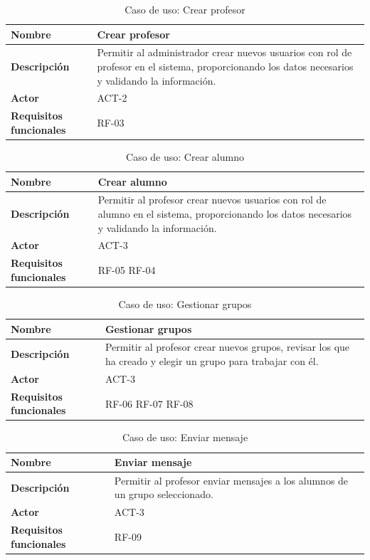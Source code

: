 \begin{table}[H]
\centering
\begin{tabularx}{\textwidth}{
  |>{\centering\arraybackslash}l
  |>{\centering\arraybackslash}X|}
\hline
\textbf{Nombre} & {\textbf{Crear profesor}} \\ \hline

\textbf{Descripción} & Permitir al administrador crear nuevos usuarios con rol de profesor en el sistema, proporcionando los datos necesarios y validando la información. \\ \hline
\textbf{Actor} & ACT-2 \\ \hline
\textbf{Requisitos funcionales} & RF-03 \\ \hline
\end{tabularx}
\caption{Caso de uso: Crear profesor}
\end{table}
\begin{table}[H]
\centering
\begin{tabularx}{\textwidth}{
  |>{\centering\arraybackslash}l
  |>{\centering\arraybackslash}X|}
\hline
\textbf{Nombre} & {\textbf{Crear alumno}} \\ \hline

\textbf{Descripción} & Permitir al profesor crear nuevos usuarios con rol de alumno en el sistema, proporcionando los datos necesarios y validando la información. \\ \hline
\textbf{Actor} & ACT-3 \\ \hline
\textbf{Requisitos funcionales} & RF-05 RF-04 \\ \hline
\end{tabularx}
\caption{Caso de uso: Crear alumno}
\end{table}
\begin{table}[H]
\centering
\begin{tabularx}{\textwidth}{
  |>{\centering\arraybackslash}l
  |>{\centering\arraybackslash}X|}
\hline
\textbf{Nombre} & {\textbf{Gestionar grupos}} \\ \hline
\textbf{Descripción} & Permitir al profesor crear nuevos grupos, revisar los que ha creado y elegir un grupo para trabajar con él. \\ \hline
\textbf{Actor} & ACT-3\\ \hline
\textbf{Requisitos funcionales} & RF-06 RF-07 RF-08 \\ \hline
\end{tabularx}
\caption{Caso de uso: Gestionar grupos}
\end{table}
\begin{table}[H]
\centering
\begin{tabularx}{\textwidth}{
  |>{\centering\arraybackslash}l
  |>{\centering\arraybackslash}X|}
\hline
\textbf{Nombre} & {\textbf{Enviar mensaje}} \\ \hline

\textbf{Descripción} & Permitir al profesor enviar mensajes a los alumnos de un grupo seleccionado. \\ \hline
\textbf{Actor} & ACT-3\\ \hline
\textbf{Requisitos funcionales} & RF-09 \\ \hline
\end{tabularx}
\caption{Caso de uso: Enviar mensaje}
\end{table}
